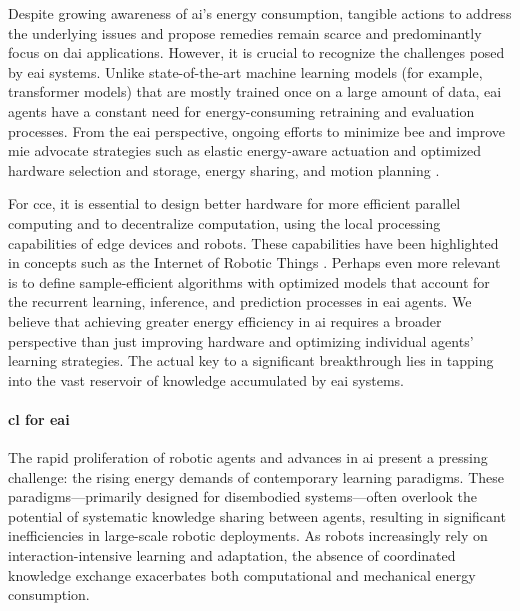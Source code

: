 \documentclass[12pt]{article}
\begin{document}
Despite growing awareness of \ac{ai}'s energy consumption, tangible actions to address the underlying issues and propose remedies remain scarce and predominantly focus on \ac{dai} applications. However, it is crucial to recognize the challenges posed by \ac{eai} systems. Unlike state-of-the-art machine learning models (for example, transformer models) that are mostly trained once on a large amount of data, \ac{eai} agents have a constant need for energy-consuming retraining and evaluation processes. From the \ac{eai} perspective, ongoing efforts to minimize \ac{bee} and improve \ac{mie} advocate strategies such as elastic energy-aware actuation and optimized hardware selection and storage, energy sharing, and motion planning \cite{CUT2015Smoothrobotmovements, Mohammed2014MinimizingEnergyConsumption, Chemnitz2011Analyzingenergyconsumption,Vasarhelyi2023OverviewEnergiesProblems,Sekala2024SelectedIssuesMethods}.

For \ac{cce}, it is essential to design better hardware for more efficient parallel computing and to decentralize computation, using the local processing capabilities of edge devices and robots. These capabilities have been highlighted in concepts such as the Internet of Robotic Things \cite{Vermesan2020InternetRoboticThings,Sekala2024SelectedIssuesMethods}. Perhaps even more relevant is to define sample-efficient algorithms with optimized models that account for the recurrent learning, inference, and prediction processes in \ac{eai} agents. We believe that achieving greater energy efficiency in \ac{ai} requires a broader perspective than just improving hardware and optimizing individual agents' learning strategies. The actual key to a significant breakthrough lies in tapping into the vast reservoir of knowledge accumulated by \ac{eai} systems.

\paragraph*{\Acl{cl} for \ac{eai}} The rapid proliferation of robotic agents and advances in \ac{ai} present a pressing challenge: the rising energy demands of contemporary learning paradigms. These paradigms---primarily designed for disembodied systems---often overlook the potential of systematic knowledge sharing between agents, resulting in significant inefficiencies in large-scale robotic deployments. As robots increasingly rely on interaction-intensive learning and adaptation, the absence of coordinated knowledge exchange exacerbates both computational and mechanical energy consumption.
\end{document}
